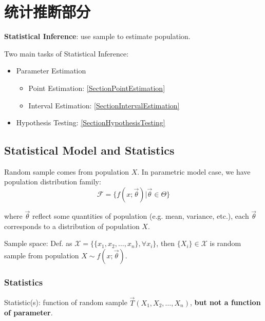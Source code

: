 \documentclass[11pt,a4paper]{ctexart}
\numberwithin{equation}{section}%
\begin{document}
\newpage
\section{统计推断部分}

    \textbf{Statistical Inference}: use sample to estimate population.
    
    Two main tasks of Statistical Inference:
    \begin{itemize}[topsep= -5 pt,itemsep= -5 pt,parsep= 0 pt]
        \item Parameter Estimation
        \begin{itemize}
            \item Point Estimation: \hyperref[SectionPointEstimation]{\ref{SectionPointEstimation}}
            \item Interval Estimation: \hyperref[SectionIntervalEstimation]{\ref{SectionIntervalEstimation}}
        \end{itemize}
        \item Hypothesis Testing: \hyperref[SectionHypothesisTesting]{\ref{SectionHypothesisTesting}}
    \end{itemize}

\subsection{Statistical Model and Statistics}\label{SectionStatisticalModelandStatistics}
    Random sample comes from population $X$. In parametric model case, we have population distribution family:
    \[\mathscr{F}=\{f(x;\vec{\theta})|\vec{\theta}\in\Theta\}\]

    where  $\vec{\theta}$ reflect some quantities of population (e.g. mean, variance, etc.), each $\vec{\theta}$ corresponds to a distribution of population $X$.
    
    Sample space: Def. as $\mathscr{X}=\{\{x_1,x_2,\ldots,x_n\},\forall x_i\}$, then $\{X_i\}\in\mathscr{X}$ is random sample from population $X\sim f(x;\vec{\theta})$.

    
\subsubsection{Statistics}\label{SubSectionStatistics}
    Statistic(s): function of random sample $\vec{T}(X_1,X_2,\ldots,X_n)$, \textbf{but not a function of parameter}.
    
\end{document}

